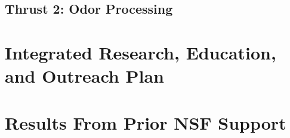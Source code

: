 \documentclass[11 pt]{article}
\begin{document}
%

\subsection{Thrust 2: Odor Processing}
\label{sec:tract2}
\label{ssec:research2}


%

\section{Integrated Research, Education, and Outreach Plan}
\label{sec:irep}


\section{Results From Prior NSF Support}
\label{sec:prior_nsf}




\end{document}
